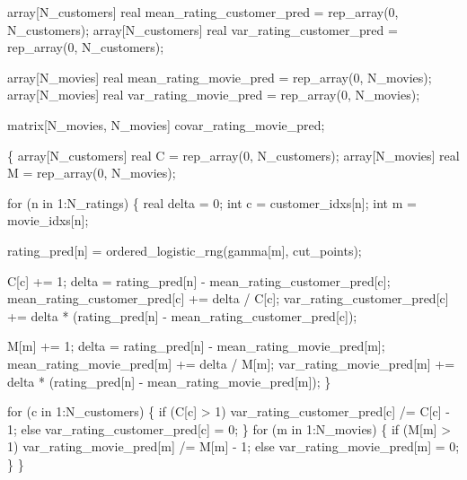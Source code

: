 \documentclass[
  letterpaper,
  DIV=11,
  numbers=noendperiod]{scrartcl}
\newenvironment{Shaded}{\begin{snugshade}}{\end{snugshade}}
\newcommand{\ControlFlowTok}[1]{\textcolor[rgb]{0.00,0.23,0.31}{#1}}
\newcommand{\DataTypeTok}[1]{\textcolor[rgb]{0.68,0.00,0.00}{#1}}
\newcommand{\DecValTok}[1]{\textcolor[rgb]{0.68,0.00,0.00}{#1}}
\newcommand{\NormalTok}[1]{\textcolor[rgb]{0.00,0.23,0.31}{#1}}
\begin{document}
\begin{codelisting}
\begin{Shaded}
\begin{Highlighting}[]
  \DataTypeTok{array}\NormalTok{[N\_customers] }\DataTypeTok{real}\NormalTok{ mean\_rating\_customer\_pred}
\NormalTok{    = rep\_array(}\DecValTok{0}\NormalTok{, N\_customers);}
  \DataTypeTok{array}\NormalTok{[N\_customers] }\DataTypeTok{real}\NormalTok{ var\_rating\_customer\_pred}
\NormalTok{    = rep\_array(}\DecValTok{0}\NormalTok{, N\_customers);}

  \DataTypeTok{array}\NormalTok{[N\_movies] }\DataTypeTok{real}\NormalTok{ mean\_rating\_movie\_pred = rep\_array(}\DecValTok{0}\NormalTok{, N\_movies);}
  \DataTypeTok{array}\NormalTok{[N\_movies] }\DataTypeTok{real}\NormalTok{ var\_rating\_movie\_pred = rep\_array(}\DecValTok{0}\NormalTok{, N\_movies);}

  \DataTypeTok{matrix}\NormalTok{[N\_movies, N\_movies] covar\_rating\_movie\_pred;}

\NormalTok{  \{}
    \DataTypeTok{array}\NormalTok{[N\_customers] }\DataTypeTok{real}\NormalTok{ C = rep\_array(}\DecValTok{0}\NormalTok{, N\_customers);}
    \DataTypeTok{array}\NormalTok{[N\_movies] }\DataTypeTok{real}\NormalTok{ M = rep\_array(}\DecValTok{0}\NormalTok{, N\_movies);}

    \ControlFlowTok{for}\NormalTok{ (n }\ControlFlowTok{in} \DecValTok{1}\NormalTok{:N\_ratings) \{}
      \DataTypeTok{real}\NormalTok{ delta = }\DecValTok{0}\NormalTok{;}
      \DataTypeTok{int}\NormalTok{ c = customer\_idxs[n];}
      \DataTypeTok{int}\NormalTok{ m = movie\_idxs[n];}

\NormalTok{      rating\_pred[n] = ordered\_logistic\_rng(gamma[m], cut\_points);}

\NormalTok{      C[c] += }\DecValTok{1}\NormalTok{;}
\NormalTok{      delta = rating\_pred[n] {-} mean\_rating\_customer\_pred[c];}
\NormalTok{      mean\_rating\_customer\_pred[c] += delta / C[c];}
\NormalTok{      var\_rating\_customer\_pred[c]}
\NormalTok{        += delta * (rating\_pred[n] {-} mean\_rating\_customer\_pred[c]);}

\NormalTok{      M[m] += }\DecValTok{1}\NormalTok{;}
\NormalTok{      delta = rating\_pred[n] {-} mean\_rating\_movie\_pred[m];}
\NormalTok{      mean\_rating\_movie\_pred[m] += delta / M[m];}
\NormalTok{      var\_rating\_movie\_pred[m]}
\NormalTok{        += delta * (rating\_pred[n] {-} mean\_rating\_movie\_pred[m]);}
\NormalTok{    \}}

    \ControlFlowTok{for}\NormalTok{ (c }\ControlFlowTok{in} \DecValTok{1}\NormalTok{:N\_customers) \{}
      \ControlFlowTok{if}\NormalTok{ (C[c] \textgreater{} }\DecValTok{1}\NormalTok{)}
\NormalTok{        var\_rating\_customer\_pred[c] /= C[c] {-} }\DecValTok{1}\NormalTok{;}
      \ControlFlowTok{else}
\NormalTok{        var\_rating\_customer\_pred[c] = }\DecValTok{0}\NormalTok{;}
\NormalTok{    \}}
    \ControlFlowTok{for}\NormalTok{ (m }\ControlFlowTok{in} \DecValTok{1}\NormalTok{:N\_movies) \{}
      \ControlFlowTok{if}\NormalTok{ (M[m] \textgreater{} }\DecValTok{1}\NormalTok{)}
\NormalTok{        var\_rating\_movie\_pred[m] /= M[m] {-} }\DecValTok{1}\NormalTok{;}
      \ControlFlowTok{else}
\NormalTok{        var\_rating\_movie\_pred[m] = }\DecValTok{0}\NormalTok{;}
\NormalTok{    \}}
\NormalTok{  \}}


\end{Highlighting}
\end{Shaded}
\end{codelisting}
\end{document}
